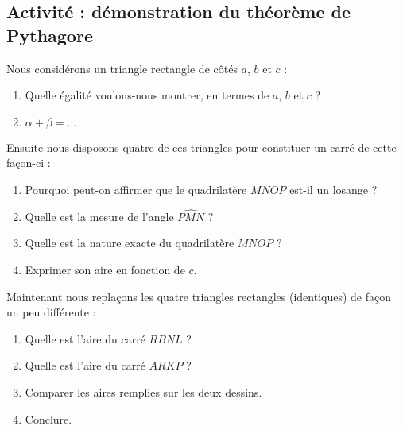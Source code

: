
\subsection*{Activité : démonstration du théorème de Pythagore}

Nous considérons un triangle rectangle de côtés \( a\), \( b\) et \( c\) :
\begin{center}
   
\end{center}

\begin{enumerate}
    \item
        Quelle égalité voulons-nous montrer, en termes de \( a\), \( b\) et \( c\) ?
    \item
        \( \alpha+\beta=\ldots\)
\end{enumerate}

Ensuite nous disposons quatre de ces triangles pour constituer un carré de cette façon-ci :
\begin{center}
   
\end{center}

\begin{enumerate}
    \item
        Pourquoi peut-on affirmer que le quadrilatère \( MNOP\) est-il un losange ?
    \item
        Quelle est la mesure de l'angle $\widehat{PMN}$ ?
    \item
        Quelle est la nature exacte du quadrilatère \( MNOP\) ?
    \item
        Exprimer son aire en fonction de \( c\).
\end{enumerate}

Maintenant nous replaçons les quatre triangles rectangles (identiques) de façon un peu différente :

\begin{center}
   
\end{center}

\begin{enumerate}
    \item
        Quelle est l'aire du carré \( RBNL\) ?
    \item
        Quelle est l'aire du carré \( ARKP\) ?
    \item
        Comparer les aires remplies sur les deux dessins.
    \item
        Conclure.
\end{enumerate}

